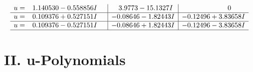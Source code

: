\documentclass[1p]{elsarticle_modified}
\theoremstyle{definition}
\begin{document}
$$\begin{array}{c|c|c}
\begin{aligned}
u &= \phantom{-}1.140530 - 0.558856 I\end{aligned}
 & \phantom{-}3.9773 - 15.1327 I & \phantom{-0.000000 } 0 \\ \hline\begin{aligned}
u &= \phantom{-}0.109376 + 0.527151 I\end{aligned}
 & -0.08646 - 1.82443 I & -0.12496 + 3.83658 I \\ \hline\begin{aligned}
u &= \phantom{-}0.109376 - 0.527151 I\end{aligned}
 & -0.08646 + 1.82443 I & -0.12496 - 3.83658 I\\
 \hline 
 \end{array}$$\newpage
\newpage\renewcommand{\arraystretch}{1}
\centering \section*{ II. u-Polynomials}
\end{document}
